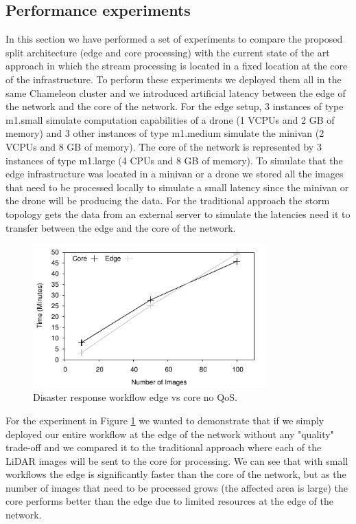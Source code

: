 \subsection{Performance experiments}
In this section we have performed a set of experiments to compare the proposed split architecture (edge and core processing) with the current state of the art approach in which the stream processing is located in a fixed location at the core of the infrastructure. To perform these experiments we deployed them all in the same Chameleon cluster and we introduced artificial latency between the edge of the network and the core of the network. For the edge setup, 3 instances of type m1.small simulate computation capabilities of a drone (1 VCPUs and 2 GB of memory) and 3 other instances of type m1.medium simulate the minivan (2 VCPUs and 8 GB of memory). The core of the network is represented by 3 instances of type m1.large (4 CPUs and 8 GB of memory). To simulate that the edge infrastructure was located in a minivan or a drone we stored all the images that need to be processed locally to simulate a small latency since the minivan or the drone will be producing the data. For the traditional approach the storm topology gets the data from an external server to simulate the latencies need it to transfer between the edge and the core of the network.

\begin{figure}[h!]
  \includegraphics[width=0.8\textwidth]{Results/EdgeVCore}
  \caption{Disaster response workflow edge vs core no QoS.}
  \label{fig:Edge_CoreVsCloud}
  \vspace{-2ex}
\end{figure}

For the experiment in Figure \ref{fig:Edge_CoreVsCloud} we wanted to demonstrate that if we simply deployed our entire workflow at the edge of the network without any "quality" trade-off and we compared it to the traditional approach where each of the LiDAR images will be sent to the core for processing. We can see that with small workflows the edge is significantly faster than the core of the network, but  
as the number of images that need to be processed grows (the affected area is large) the core performs better than the edge due to limited resources at the edge of the network.

